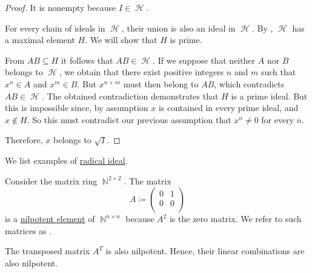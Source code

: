 \begin{proof}
  It is nonempty because \( I \in \mscrH \).

  For every chain of ideals in \( \mscrH \), their union is also an ideal in \( \mscrH \). By , \( \mscrH \) has a maximal element \( H \). We will show that \( H \) is prime.

  From \( AB \subseteq H \) it follows that \( AB \in \mscrH \). If we suppose that neither \( A \) nor \( B \) belongs to \( \mscrH \), we obtain that there exist positive integers \( n \) and \( m \) such that \( x^n \in A \) and \( x^m \in B \). But \( x^{n + m} \) must then belong to \( AB \), which contradicts \( AB \in \mscrH \). The obtained contradiction demonstrates that \( H \) is a prime ideal. But this is impossible since, by assumption \( x \) is contained in every prime ideal, and \( x \not\in H \). So this must contradict our previous assumption that \( x^n \neq 0 \) for every \( n \).

  Therefore, \( x \) belongs to \( \sqrt I \).
\end{proof}

\begin{example}\label{ex:def:radical_ideal}
  We list examples of \hyperref[def:radical_ideal]{radical ideal}.

  \begin{thmenum}
     Consider the matrix ring \( \BbbN^{2 \times 2} \). The matrix
    \begin{equation*}
      A \coloneqq
      \begin{pmatrix}
        0 & 1 \\
        0 & 0 \\
      \end{pmatrix}
    \end{equation*}
    is a \hyperref[thm:def:semiring_ideal/properties/nilradical]{nilpotent element} of \( \BbbN^{n \times n} \) because \( A^2 \) is the zero matrix. We refer to such matrices as .

    The transposed matrix \( A^T \) is also nilpotent. Hence, their linear combinations are also nilpotent.
  \end{thmenum}
\end{example}
